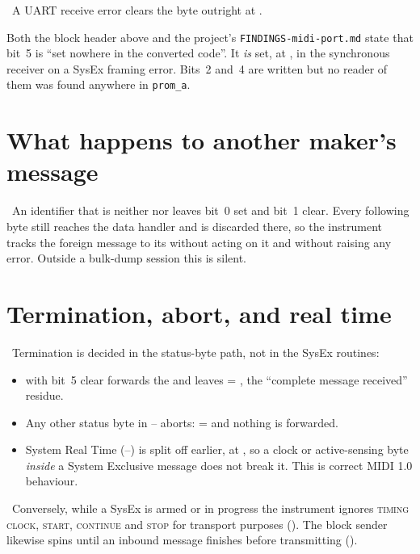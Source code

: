 \estab\ A UART receive error clears the byte outright at .

\begin{tcolorbox}[colback=blue!4!white,colframe=blue!40!black,title=A correction to the
firmware's own annotations]
Both the block header above  and the project's
\texttt{FINDINGS-midi-port.md} state that bit~5 is ``set nowhere in the converted code''.
It \emph{is} set, at , in the synchronous receiver on a SysEx framing
error. Bits~2 and~4 are written but no reader of them was found anywhere in
\texttt{prom\_a}.
\end{tcolorbox}

\section{What happens to another maker's message}
\estab\ An identifier that is neither  nor  leaves bit~0 set and
bit~1 clear. Every following byte still reaches the data handler and is discarded there,
so the instrument tracks the foreign message to its  without acting on it and
without raising any error. Outside a bulk-dump session this is silent.

\section{Termination, abort, and real time}
\estab\ Termination is decided in the status-byte path, not in the SysEx routines:

\begin{itemize}
\item {} with bit~5 clear forwards the  and leaves  =
  , the ``complete message received'' residue.
\item Any other status byte in -- aborts:  =
   and nothing is forwarded.
\item System Real Time (--) is split off earlier, at
  , so a clock or active-sensing byte \emph{inside} a System Exclusive
  message does not break it. This is correct MIDI 1.0 behaviour.
\end{itemize}

\estab\ Conversely, while a SysEx is armed or in progress the instrument ignores
 \textsc{timing clock},  \textsc{start}, 
\textsc{continue} and  \textsc{stop} for transport purposes
(). The block sender likewise spins until an inbound message finishes
before transmitting ().
